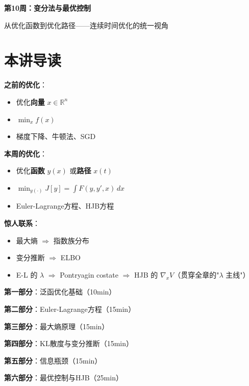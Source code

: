 \documentclass[12pt, a4paper]{ctexart}
\begin{document}
\begin{center}
{\LARGE\bfseries 第10周：变分法与最优控制}

\vspace{0.5cm}
{\large 从优化函数到优化路径——连续时间优化的统一视角}
\end{center}

\tableofcontents
\newpage

\section*{本讲导读}

\begin{blackboard}[本周的核心洞察]

\textbf{之前的优化}：
\begin{itemize}
    \item 优化\textbf{向量} $x \in \mathbb{R}^n$
    \item $\min_x f(x)$
    \item 梯度下降、牛顿法、SGD
\end{itemize}

\textbf{本周的优化}：
\begin{itemize}
    \item 优化\textbf{函数} $y(x)$ 或\textbf{路径} $x(t)$
    \item $\min_{y(\cdot)} J[y] = \int F(y, y', x) \, dx$
    \item Euler-Lagrange方程、HJB方程
\end{itemize}

\textbf{惊人联系}：
\begin{itemize}
    \item 最大熵 $\Rightarrow$ 指数族分布
    \item 变分推断 $\Rightarrow$ ELBO
    \item E-L 的 $\lambda$ $\Rightarrow$ Pontryagin costate $\Rightarrow$ HJB 的 $\nabla_x V$（贯穿全章的"$\lambda$ 主线"）
\end{itemize}

\end{blackboard}

\begin{blackboard}[内容结构]

\textbf{第一部分}：泛函优化基础（10min）

\textbf{第二部分}：Euler-Lagrange方程（15min）

\textbf{第三部分}：最大熵原理（15min）

\textbf{第四部分}：KL散度与变分推断（15min）

\textbf{第五部分}：信息瓶颈（15min）

\textbf{第六部分}：最优控制与HJB（25min）

\end{blackboard}
\end{document}
